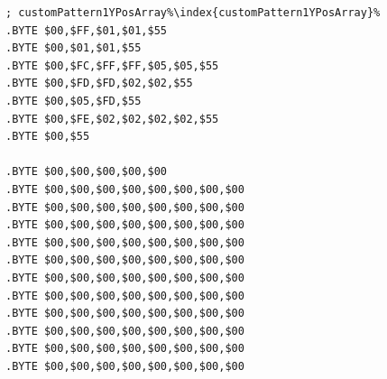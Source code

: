 \begin{minipage}[b]{0.33\linewidth}
\begin{lrbox}{\mybox}
\begin{lstlisting}[basicstyle=\ttfamily\tiny,escapechar=\%]
; customPattern1YPosArray%\index{customPattern1YPosArray}%
.BYTE $00,$FF,$01,$01,$55
.BYTE $00,$01,$01,$55
.BYTE $00,$FC,$FF,$FF,$05,$05,$55
.BYTE $00,$FD,$FD,$02,$02,$55
.BYTE $00,$05,$FD,$55
.BYTE $00,$FE,$02,$02,$02,$02,$55
.BYTE $00,$55

.BYTE $00,$00,$00,$00,$00
.BYTE $00,$00,$00,$00,$00,$00,$00,$00
.BYTE $00,$00,$00,$00,$00,$00,$00,$00
.BYTE $00,$00,$00,$00,$00,$00,$00,$00
.BYTE $00,$00,$00,$00,$00,$00,$00,$00
.BYTE $00,$00,$00,$00,$00,$00,$00,$00
.BYTE $00,$00,$00,$00,$00,$00,$00,$00
.BYTE $00,$00,$00,$00,$00,$00,$00,$00
.BYTE $00,$00,$00,$00,$00,$00,$00,$00
.BYTE $00,$00,$00,$00,$00,$00,$00,$00
.BYTE $00,$00,$00,$00,$00,$00,$00,$00
.BYTE $00,$00,$00,$00,$00,$00,$00,$00

\end{lstlisting}
\end{lrbox}%
\scalebox{0.8}{\usebox{\mybox}}
\end{minipage}
